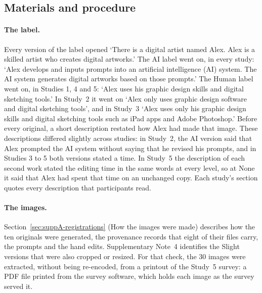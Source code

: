 \subsection*{Materials and procedure}

\paragraph*{The label.}
Every version of the label opened `There is a digital artist named Alex. Alex is a skilled artist who creates digital artworks.' The AI label went on, in every study: `Alex develops and inputs prompts into an artificial intelligence (AI) system. The AI system generates digital artworks based on those prompts.' The Human label went on, in Studies 1, 4 and 5: `Alex uses his graphic design skills and digital sketching tools.' In Study~2 it went on `Alex only uses graphic design software and digital sketching tools', and in Study~3 `Alex uses only his graphic design skills and digital sketching tools such as iPad apps and Adobe Photoshop.' Before every original, a short description restated how Alex had made that image. These descriptions differed slightly across studies: in Study~2, the AI version said that Alex prompted the AI system without saying that he revised his prompts, and in Studies 3 to 5 both versions stated a time. In Study~5 the description of each second work stated the editing time in the same words at every level, so at None it said that Alex had spent that time on an unchanged copy. Each study's section quotes every description that participants read.

\paragraph*{The images.}
Section~\ref{sec:suppA-registrations} (How the images were made) describes how the ten originals were generated, the provenance records that eight of their files carry, the prompts and the hand edits. Supplementary Note~4 identifies the \XSImageCheckSlightReframedN{} Slight versions that were also cropped or resized. For that check, the 30 images were extracted, without being re-encoded, from a printout of the Study~5 survey: a PDF file printed from the survey software, which holds each image as the survey served it.

